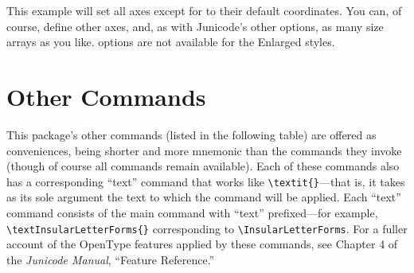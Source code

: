 \noindent This example will set all axes except for  to their default coordinates.
You can, of course, define other axes, and, as with Junicode’s other  options,
as many size arrays as you like.  options are not available for the Enlarged 
styles.

\section{Other Commands}

This package's other commands (listed in the following table) are offered as conveniences, being shorter and more
mnemonic than the {\fspec} commands they invoke (though of course all {\fspec} commands
remain available). Each of these commands
also has a corresponding “text” command that works like 
{\color{BrickRed}\verb|\textit{}|}---that is, it takes
as its sole argument the text to which the command will be applied. Each “text” command
consists of the main command with “text” prefixed---for example,
{\color{BrickRed}\verb|\textInsularLetterForms{}|}
corresponding to {\color{BrickRed}\verb|\InsularLetterForms|}.  For a fuller account of the OpenType features
applied by these commands, see Chapter 4 of the \textit{Junicode Manual}, “Feature Reference.”

